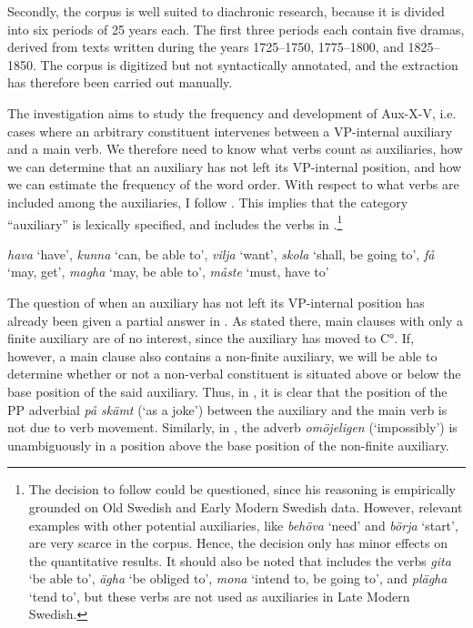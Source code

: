 \documentclass[output=paper, colorlinks, citecolor=brown]{langscibook}
\begin{document}
Secondly, the corpus is well suited to diachronic research, because it is divided into six periods of 25 years each. The first three periods each contain five dramas, derived from texts written during the years 1725–1750, 1775–1800, and 1825–1850. The corpus is digitized but not syntactically annotated, and the extraction has therefore been carried out manually.


The investigation aims to study the frequency and development of Aux-X-V, i.e. cases where an arbitrary constituent intervenes between a VP-internal auxiliary and a main verb. We therefore need to know what verbs count as auxiliaries, how we can determine that an auxiliary has not left its VP-internal position, and how we can estimate the frequency of the word order. With respect to what verbs are included among the auxiliaries, I follow \citet[162--163]{Delsing1999}. This implies that the category “auxiliary” is lexically specified, and includes the verbs in .\footnote{The decision to follow \citet{Delsing1999} could be questioned, since his reasoning is empirically grounded on Old Swedish and Early Modern Swedish data. However, relevant examples with other potential auxiliaries, like \textit{behöva} ‘need’ and \textit{börja} ‘start’, are very scarce in the corpus. Hence, the decision only has minor effects on the quantitative results. It should also be noted that \citet{Delsing1999} includes the verbs \textit{gita} ‘be able to’, \textit{ägha} ‘be obliged to’, \textit{mona} ‘intend to, be going to’, and \textit{plägha} ‘tend to’, but these verbs are not used as auxiliaries in Late Modern Swedish.}


\ea
\label{ex:sangfelt:21}
\textit{hava} ‘have’,
\textit{kunna} ‘can, be able to’,
\textit{vilja} ‘want’,
\textit{skola} ‘shall, be going to’, 
\textit{få} ‘may, get’,
\textit{magha} ‘may, be able to’,
\textit{måste} ‘must, have to’
\z 


The question of when an auxiliary has not left its VP-internal position has already been given a partial answer in . As stated there, main clauses with only a finite auxiliary are of no interest, since the auxiliary has moved to C°. If, however, a main clause also contains a non-finite auxiliary, we will be able to determine whether or not a non-verbal constituent is situated above or below the base position of the said auxiliary. Thus, in , it is clear that the position of the PP adverbial \textit{på skämt} (‘as a joke’) between the auxiliary and the main verb is not due to verb movement. Similarly, in , the adverb \textit{omöjeligen} (‘impossibly’) is unambiguously in a position above the base position of the non-finite auxiliary.
\end{document}
